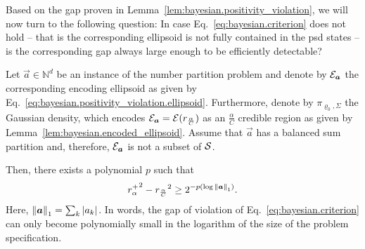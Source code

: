 Based on the gap proven in Lemma~\ref{lem:bayesian.positivity_violation}, we will now turn to the following question:
In case Eq.~\eqref{eq:bayesian.criterion} does not hold -- that is the corresponding ellipsoid is not fully contained in the psd states -- is the corresponding gap always large enough to be efficiently detectable?
\begin{lemma}\label{lem:bayesian.r_separation}
   Let $\vec a \in \mathbb{N}^d$ be an instance of the number partition problem and denote by $\mathcal{E}_{{\boldsymbol{a}}}$ the corresponding encoding ellipsoid as given by Eq.~\eqref{eq:bayesian.positivity_violation.ellipsoid}.
  Furthermore, denote by $\pi_{\varrho_0,\Sigma}$ the Gaussian density, which encodes $\mathcal{E}_{{\boldsymbol{a}}} = \mathcal{E}(r_\frac{\alpha}{C})$ as an $\frac{\alpha}{C}$ credible region as given by Lemma~\ref{lem:bayesian.encoded_ellipsoid}.
  Assume that $\vec a$ has a balanced sum partition and, therefore, $\mathcal{E}_{{\boldsymbol{a}}}$ is not a subset of $\mathcal{S}$.

  Then, there exists a polynomial $p$ such that
  \[
    {r^+_{\alpha}}^2 - {r_\frac{\alpha}{C}}^2 \ge 2^{-p(\log {\Vert{\boldsymbol{a}}\Vert}_1)}.
  \]
  Here, ${\Vert{\boldsymbol{a}}\Vert}_1 = \sum_k {\vert a_k\vert}$.
  In words, the gap of violation of Eq.~\eqref{eq:bayesian.criterion} can only become polynomially small in the logarithm of the size of the problem specification.
\end{lemma}
